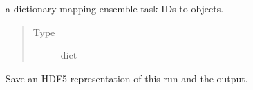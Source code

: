 \documentclass[letterpaper,10pt,english]{sphinxmanual}
\begin{document}
\begin{fulllineitems}
\begin{fulllineitems}
\begin{quote}
\begin{description}
\end{description}\end{quote}

\end{fulllineitems}


\begin{fulllineitems}
\label{\detokenize{interface:scdc.interface.Configuration.task_by_id}}
a dictionary mapping ensemble task IDs to
 objects.
\begin{quote}\begin{description}
\item[{Type}] \leavevmode
dict

\end{description}\end{quote}

\end{fulllineitems}


\begin{fulllineitems}
\label{\detokenize{interface:scdc.interface.Configuration.save}}
Save an HDF5 representation of this run and the output.

\end{fulllineitems}


\end{fulllineitems}

\end{document}
